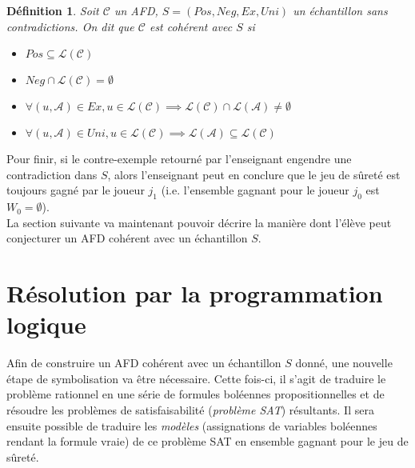\documentclass[12pt,a4paper,oneside,titlepage]{report}
\newtheorem{defi}{D\'efinition}[section]
\begin{document}
\begin{defi}
\label{consistency}
Soit $\mathcal{C}$ un AFD, $S=(Pos, Neg, Ex, Uni)$ un échantillon sans contradictions. On dit que $\mathcal{C}$ est \emph{cohérent} avec $S$ si
\begin{itemize}
\item $Pos\subseteq \mathcal{L}(\mathcal{C})$
\item $Neg\cap \mathcal{L}(\mathcal{C})=\emptyset$
\item $\forall (u,\mathcal{A})\in Ex, u\in\mathcal{L}(\mathcal{C})\implies  \mathcal{L}(\mathcal{C})\cap \mathcal{L}(\mathcal{A})\neq\emptyset$
\item $\forall (u,\mathcal{A})\in Uni, u\in\mathcal{L}(\mathcal{C})\implies  \mathcal{L}(\mathcal{A})\subseteq \mathcal{L}(\mathcal{C})$
\end{itemize}
\end{defi}
\noindent Pour finir, si le contre-exemple retourné par l'enseignant engendre une contradiction dans $S$, alors l'enseignant peut en conclure que le jeu de sûreté est toujours gagné par le joueur $j_1$ (i.e. l'ensemble gagnant pour le joueur $j_0$ est $W_0=\emptyset$).\\

\noindent La section suivante va maintenant pouvoir décrire la manière dont l'élève peut conjecturer un AFD cohérent avec un échantillon $S$.
\section{Résolution par la programmation logique}\label{prolog}
Afin de construire un AFD cohérent avec un échantillon $S$ donné, une nouvelle étape de symbolisation va être nécessaire. Cette fois-ci, il s'agit de traduire le problème rationnel en une série de formules boléennes propositionnelles et de résoudre les problèmes de satisfaisabilité (\emph{problème SAT}) résultants. Il sera ensuite possible de traduire les \emph{modèles} (assignations de variables boléennes rendant la formule vraie) de ce problème SAT en ensemble gagnant pour le jeu de sûreté.
\end{document}
